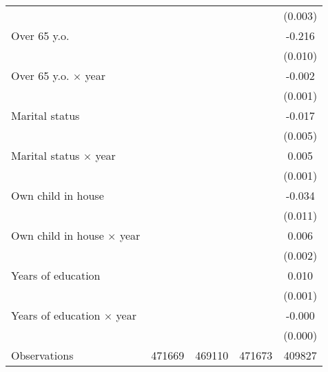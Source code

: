 {\begin{longtable}{l*{4}{c}}
                &                  &                  &                  &  (0.003)         \\
\addlinespace
Over 65 y.o.    &                  &                  &                  &   -0.216\sym{***}\\
                &                  &                  &                  &  (0.010)         \\
\addlinespace
Over 65 y.o. $\times$ year&                  &                  &                  &   -0.002         \\
                &                  &                  &                  &  (0.001)         \\
\addlinespace
Marital status  &                  &                  &                  &   -0.017\sym{**} \\
                &                  &                  &                  &  (0.005)         \\
\addlinespace
Marital status $\times$ year&                  &                  &                  &    0.005\sym{***}\\
                &                  &                  &                  &  (0.001)         \\
\addlinespace
Own child in house&                  &                  &                  &   -0.034\sym{**} \\
                &                  &                  &                  &  (0.011)         \\
\addlinespace
Own child in house $\times$ year&                  &                  &                  &    0.006\sym{**} \\
                &                  &                  &                  &  (0.002)         \\
\addlinespace
Years of education&                  &                  &                  &    0.010\sym{***}\\
                &                  &                  &                  &  (0.001)         \\
\addlinespace
Years of education $\times$ year&                  &                  &                  &   -0.000\sym{*}  \\
                &                  &                  &                  &  (0.000)         \\
\midrule
Observations    &   471669         &   469110         &   471673         &   409827         \\

\end{longtable}}
